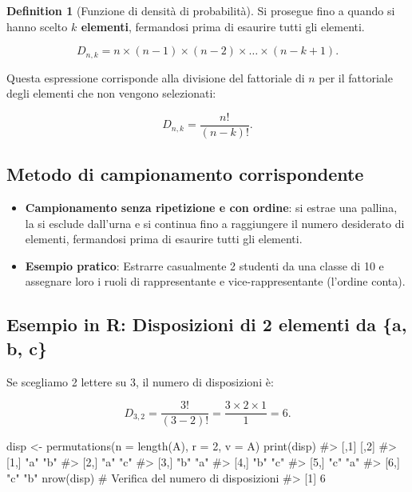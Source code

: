 \documentclass[
  letterpaper,
  DIV=11,
  numbers=noendperiod,
  oneside]{scrreprt}
\newenvironment{Shaded}{\begin{snugshade}}{\end{snugshade}}
\newcommand{\AttributeTok}[1]{\textcolor[rgb]{0.40,0.45,0.13}{#1}}
\newcommand{\CommentTok}[1]{\textcolor[rgb]{0.37,0.37,0.37}{#1}}
\newcommand{\DecValTok}[1]{\textcolor[rgb]{0.68,0.00,0.00}{#1}}
\newcommand{\FunctionTok}[1]{\textcolor[rgb]{0.28,0.35,0.67}{#1}}
\newcommand{\NormalTok}[1]{\textcolor[rgb]{0.00,0.23,0.31}{#1}}
\newcommand{\OtherTok}[1]{\textcolor[rgb]{0.00,0.23,0.31}{#1}}
\providecommand{\tightlist}{%
  \setlength{\itemsep}{0pt}\setlength{\parskip}{0pt}}
\theoremstyle{definition}
\theoremstyle{plain}
\theoremstyle{definition}
\newtheorem{definition}{Definition}[chapter]
\theoremstyle{remark}
\begin{document}
\begin{definition}[Funzione di densità di
probabilità]
Si prosegue fino a quando si hanno scelto \textbf{\(k\) elementi},
fermandosi prima di esaurire tutti gli elementi.

\[
D_{n,k} = n \times (n-1) \times (n-2) \times \dots \times (n-k+1) .
\]

Questa espressione corrisponde alla divisione del fattoriale di \(n\)
per il fattoriale degli elementi che non vengono selezionati:

\[
D_{n,k} = \frac{n!}{(n-k)!} .
\]

\subsection{Metodo di campionamento
corrispondente}\label{metodo-di-campionamento-corrispondente-1}

\begin{itemize}
\tightlist
\item
  \textbf{Campionamento senza ripetizione e con ordine}: si estrae una
  pallina, la si esclude dall'urna e si continua fino a raggiungere il
  numero desiderato di elementi, fermandosi prima di esaurire tutti gli
  elementi.\\
\item
  \textbf{Esempio pratico}: Estrarre casualmente 2 studenti da una
  classe di 10 e assegnare loro i ruoli di rappresentante e
  vice-rappresentante (l'ordine conta).
\end{itemize}

\subsection{Esempio in R: Disposizioni di 2 elementi da \{a, b,
c\}}\label{esempio-in-r-disposizioni-di-2-elementi-da-a-b-c}

Se scegliamo 2 lettere su 3, il numero di disposizioni è:

\[
D_{3,2} = \frac{3!}{(3-2)!} = \frac{3 \times 2 \times 1}{1} = 6.
\]

\begin{Shaded}
\begin{Highlighting}[]
\NormalTok{disp }\OtherTok{\textless{}{-}} \FunctionTok{permutations}\NormalTok{(}\AttributeTok{n =} \FunctionTok{length}\NormalTok{(A), }\AttributeTok{r =} \DecValTok{2}\NormalTok{, }\AttributeTok{v =}\NormalTok{ A)}
\FunctionTok{print}\NormalTok{(disp)}
\CommentTok{\#\textgreater{}      [,1] [,2]}
\CommentTok{\#\textgreater{} [1,] "a"  "b" }
\CommentTok{\#\textgreater{} [2,] "a"  "c" }
\CommentTok{\#\textgreater{} [3,] "b"  "a" }
\CommentTok{\#\textgreater{} [4,] "b"  "c" }
\CommentTok{\#\textgreater{} [5,] "c"  "a" }
\CommentTok{\#\textgreater{} [6,] "c"  "b"}
\FunctionTok{nrow}\NormalTok{(disp)  }\CommentTok{\# Verifica del numero di disposizioni}
\CommentTok{\#\textgreater{} [1] 6}
\end{Highlighting}
\end{Shaded}


\end{definition}
\end{document}
